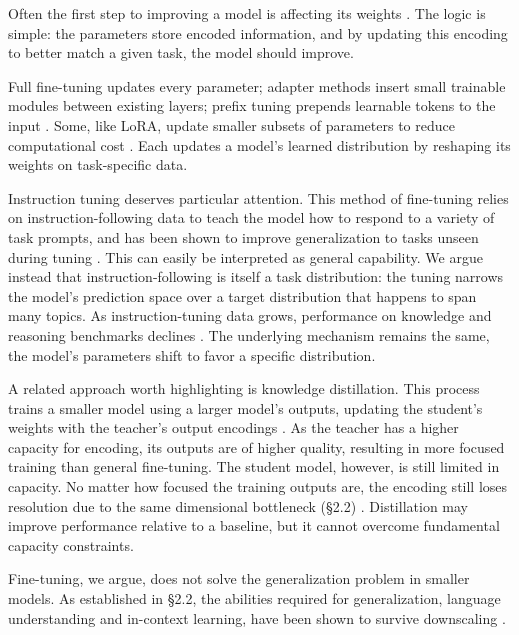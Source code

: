 \documentclass{article}
\begin{document}
Often the first step to improving a model is affecting its weights \cite{peft_survey2024}. The logic is simple: the parameters store encoded information, and by updating this encoding to better match a given task, the model should improve.

Full fine-tuning updates every parameter; adapter methods insert small trainable modules between existing layers; prefix tuning prepends learnable tokens to the input \cite{hu2022lora, houlsby2019adapters, li2021prefixtuning}. Some, like LoRA, update smaller subsets of parameters to reduce computational cost \cite{hu2022lora}. Each updates a model's learned distribution by reshaping its weights on task-specific data.

Instruction tuning deserves particular attention. This method of fine-tuning relies on instruction-following data to teach the model how to respond to a variety of task prompts, and has been shown to improve generalization to tasks unseen during tuning \cite{instructiontuning2022}. This can easily be interpreted as general capability. We argue instead that instruction-following is itself a task distribution: the tuning narrows the model's prediction space over a target distribution that happens to span many topics. As instruction-tuning data grows, performance on knowledge and reasoning benchmarks declines \cite{alignment_tax2024}. The underlying mechanism remains the same, the model's parameters shift to favor a specific distribution.

A related approach worth highlighting is knowledge distillation. This process trains a smaller model using a larger model's outputs, updating the student's weights with the teacher's output encodings \cite{hinton2015distilling}. As the teacher has a higher capacity for encoding, its outputs are of higher quality, resulting in more focused training than general fine-tuning. The student model, however, is still limited in capacity. No matter how focused the training outputs are, the encoding still loses resolution due to the same dimensional bottleneck (\S2.2) \cite{godey2024softmax, costofdownscaling2023}. Distillation may improve performance relative to a baseline, but it cannot overcome fundamental capacity constraints.

Fine-tuning, we argue, does not solve the generalization problem in smaller models. As established in \S2.2, the abilities required for generalization, language understanding and in-context learning, have been shown to survive downscaling \cite{costofdownscaling2023, linguistic_competence_scale2025}.
\end{document}
